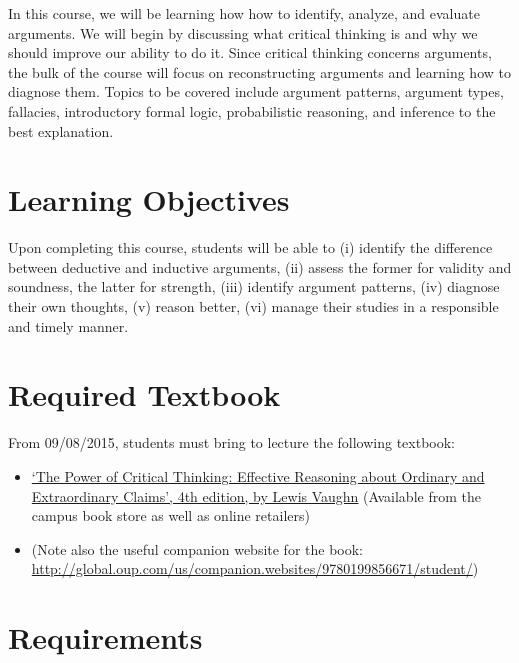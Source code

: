 \documentclass[11pt,article,oneside]{memoir}
\begin{document}
In this course, we will be learning how how to identify, analyze, and
evaluate arguments. We will begin by discussing what critical thinking
is and why we should improve our ability to do it. Since critical
thinking concerns arguments, the bulk of the course will focus on
reconstructing arguments and learning how to diagnose them. Topics to be covered include argument patterns, argument types, fallacies,
introductory formal logic, probabilistic reasoning, and inference to the best explanation.


\section{Learning Objectives}

Upon completing this course, students will be able to (i) identify the
difference between deductive and inductive arguments, (ii) assess the
former for validity and soundness, the latter for strength, (iii)
identify argument patterns, (iv) diagnose their own thoughts, (v) reason
better, (vi) manage their studies in a responsible and timely manner.

\section{Required Textbook}

From 09/08/2015, students must bring to lecture the following textbook:

\begin{itemize}
\item
  \href{http://www.amazon.com/Power-Critical-Thinking-Effective-Extraordinary/dp/0199856672/ref=sr_1_1?s=books\&ie=UTF8\&qid=1421936130\&sr=1-1\&keywords=critical+thinking+vaughn}{`The
  Power of Critical Thinking: Effective Reasoning about Ordinary and
  Extraordinary Claims', 4th edition, by Lewis Vaughn} (Available from
  the campus book store as well as online retailers)
\item (Note also the useful companion website for the book: \\  \href{http://global.oup.com/us/companion.websites/9780199856671/student/}{http://global.oup.com/us/companion.websites/9780199856671/student/})
\end{itemize}

\section{Requirements}
\end{document}
